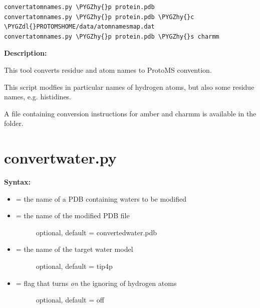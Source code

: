 \documentclass[letterpaper,10pt,english]{sphinxmanual}
\def\PYGZdl{\char`\$}
\def\PYGZhy{\char`\-}
\begin{document}
\begin{Verbatim}[commandchars=\\\{\}]
convertatomnames.py \PYGZhy{}p protein.pdb
convertatomnames.py \PYGZhy{}p protein.pdb \PYGZhy{}c \PYGZdl{}PROTOMSHOME/data/atomnamesmap.dat
convertatomnames.py \PYGZhy{}p protein.pdb \PYGZhy{}s charmm
\end{Verbatim}

\textbf{Description:}

This tool converts residue and atom names to ProtoMS convention.

This script modfies in particular names of hydrogen atoms, but also some residue names, e.g. histidines.

A file containing conversion instructions for amber and charmm is available in the  folder.


\section{convertwater.py}
\label{tools:convertwater-py}
\textbf{Syntax:}

\begin{itemize}
\item {} 
 = the name of a PDB containing waters to be modified

\item {} \begin{description}
\item[{ = the name of the modified PDB file}] \leavevmode
optional, default = convertedwater.pdb

\end{description}

\item {} \begin{description}
\item[{ = the name of the target water model}] \leavevmode
optional, default = tip4p

\end{description}

\item {} \begin{description}
\item[{ = flag that turns \emph{on} the ignoring of hydrogen atoms}] \leavevmode
optional, default = off

\end{description}

\end{itemize}
\end{document}
